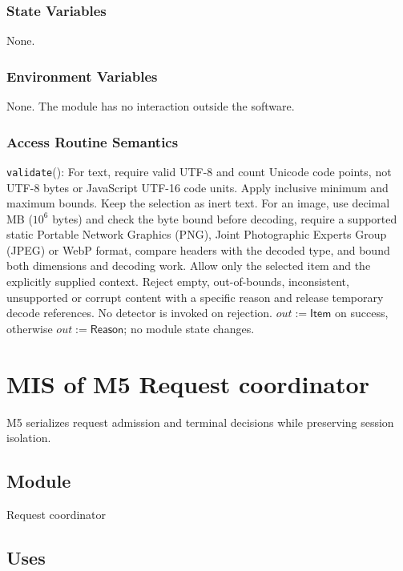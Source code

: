 \documentclass[12pt, titlepage]{article}
\newcommand{\ty}[1]{\textsf{#1}}
\begin{document}
\subsubsection{State Variables}

None.

\subsubsection{Environment Variables}

None. The module has no interaction outside the software.

\subsubsection{Access Routine Semantics}

\noindent \texttt{validate}():
For text, require valid UTF-8 and count Unicode code points, not UTF-8 bytes or JavaScript UTF-16 code units. Apply inclusive minimum and maximum bounds. Keep the selection as inert text. For an image, use decimal MB ($10^6$ bytes) and check the byte bound before decoding, require a supported static Portable Network Graphics (PNG), Joint Photographic Experts Group (JPEG) or WebP format, compare headers with the decoded type, and bound both dimensions and decoding work. Allow only the selected item and the explicitly supplied context. Reject empty, out-of-bounds, inconsistent, unsupported or corrupt content with a specific reason and release temporary decode references. No detector is invoked on rejection. $out:=\ty{Item}$ on success, otherwise $out:=\ty{Reason}$; no module state changes.

\clearpage
\section{MIS of M5 Request coordinator} \label{sec:m5}

M5 serializes request admission and terminal decisions while preserving session isolation.

\subsection{Module}

Request coordinator

\subsection{Uses}
\end{document}
